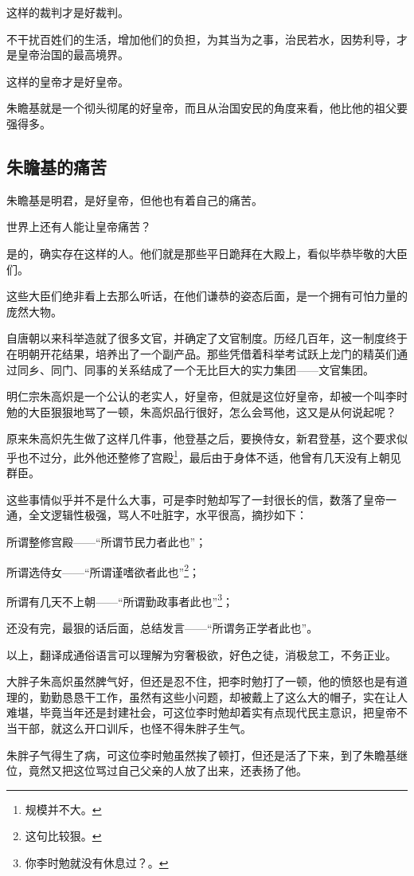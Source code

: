 \begin{multicols}{\theparacolNo}
这样的裁判才是好裁判。

不干扰百姓们的生活，增加他们的负担，为其当为之事，治民若水，因势利导，才是皇帝治国的最高境界。

这样的皇帝才是好皇帝。

朱瞻基就是一个彻头彻尾的好皇帝，而且从治国安民的角度来看，他比他的祖父要强得多。

\subsection{朱瞻基的痛苦}
朱瞻基是明君，是好皇帝，但他也有着自己的痛苦。

世界上还有人能让皇帝痛苦？

是的，确实存在这样的人。他们就是那些平日跪拜在大殿上，看似毕恭毕敬的大臣们。

这些大臣们绝非看上去那么听话，在他们谦恭的姿态后面，是一个拥有可怕力量的庞然大物。

自唐朝以来科举造就了很多文官，并确定了文官制度。历经几百年，这一制度终于在明朝开花结果，培养出了一个副产品。那些凭借着科举考试跃上龙门的精英们通过同乡、同门、同事的关系结成了一个无比巨大的实力集团——文官集团。

明仁宗朱高炽是一个公认的老实人，好皇帝，但就是这位好皇帝，却被一个叫李时勉的大臣狠狠地骂了一顿，朱高炽品行很好，怎么会骂他，这又是从何说起呢？

原来朱高炽先生做了这样几件事，他登基之后，要换侍女，新君登基，这个要求似乎也不过分，此外他还整修了宫殿\footnote{规模并不大。}，最后由于身体不适，他曾有几天没有上朝见群臣。

这些事情似乎并不是什么大事，可是李时勉却写了一封很长的信，数落了皇帝一通，全文逻辑性极强，骂人不吐脏字，水平很高，摘抄如下：

所谓整修宫殿——“所谓节民力者此也”；

所谓选侍女——“所谓谨嗜欲者此也”\footnote{这句比较狠。}；

所谓有几天不上朝——“所谓勤政事者此也”\footnote{你李时勉就没有休息过？。}；

还没有完，最狠的话后面，总结发言——“所谓务正学者此也”。

以上，翻译成通俗语言可以理解为穷奢极欲，好色之徒，消极怠工，不务正业。

大胖子朱高炽虽然脾气好，但还是忍不住，把李时勉打了一顿，他的愤怒也是有道理的，勤勤恳恳干工作，虽然有这些小问题，却被戴上了这么大的帽子，实在让人难堪，毕竟当年还是封建社会，可这位李时勉却着实有点现代民主意识，把皇帝不当干部，就这么开口训斥，也怪不得朱胖子生气。

朱胖子气得生了病，可这位李时勉虽然挨了顿打，但还是活了下来，到了朱瞻基继位，竟然又把这位骂过自己父亲的人放了出来，还表扬了他。


\end{multicols}
